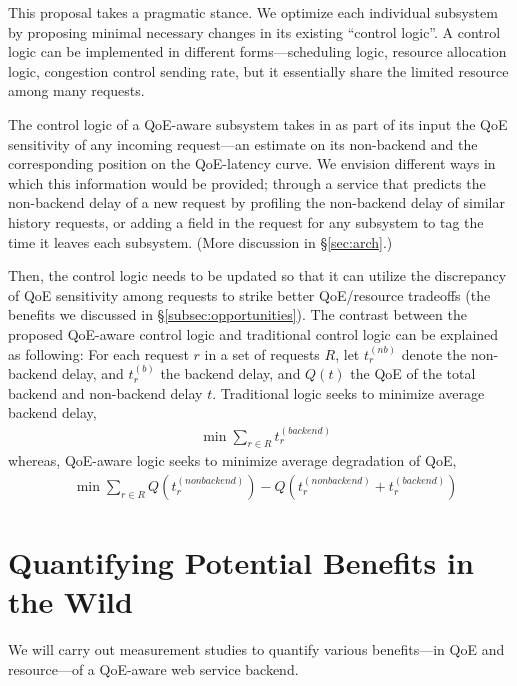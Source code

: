This proposal takes a pragmatic stance. 
We optimize each individual subsystem by proposing minimal necessary changes in its existing ``control logic''.
A control logic can be implemented in different forms---\eg scheduling logic, resource allocation logic, congestion control sending rate, but it essentially share the limited resource among many requests.
\begin{packeditemize}
    \item The control logic of a QoE-aware subsystem takes in as part of its input the QoE sensitivity of any incoming request---an estimate on its non-backend and the corresponding position on the QoE-latency curve. 
    We envision different ways in which this information would be provided; \eg through a service that predicts the non-backend delay of a new request by profiling the non-backend delay of similar history requests, or adding a field in the request for any subsystem to tag the time it leaves each subsystem. (More discussion in \S\ref{sec:arch}.)
    \item Then, the control logic needs to be updated so that it can utilize the discrepancy of QoE sensitivity among requests to strike better QoE/resource tradeoffs (\ie the benefits we discussed in \S\ref{subsec:opportunities}).
    The contrast between the proposed QoE-aware control logic and traditional control logic can be explained as following: 
    For each request $r$ in a set of requests $R$, let $t_{r}^{(nb)}$ denote the non-backend delay, and $t_{r}^{(b)}$ the backend delay, and $Q(t)$ the QoE of the total backend and non-backend delay $t$.
    Traditional logic seeks to minimize average backend delay, \ie
    \begin{align}
        & \min \sum_{r\in R} t_{r}^{(backend)} \label{eq:old}
    \end{align}
    whereas, QoE-aware logic seeks to minimize average degradation of QoE, \ie
    \begin{align}
        & \min \sum_{r\in R} Q\left(t_{r}^{(nonbackend)}\right)-Q\left(t_{r}^{(nonbackend)}+t_{r}^{(backend)}\right) \label{eq:new}
    \end{align}
\end{packeditemize}




\section{Quantifying Potential Benefits in the Wild}
\begin{task}
We will carry out measurement studies to quantify various benefits---in QoE and resource---of a QoE-aware web service backend.
\end{task}

